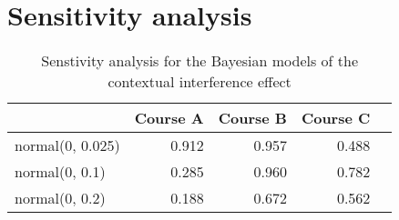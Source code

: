 \section{Sensitivity analysis}

\begin{table}[ht]
\caption{Senstivity analysis for the Bayesian models of the contextual interference effect}\label{paper1: racetimeinteraction}
\centering
\begin{tabular}{lrrrr}
    & Course A & Course B & Course C \\
    \hline
    normal(0, 0.025) & 0.912 & 0.957 & 0.488 \\
    normal(0, 0.1)   & 0.285 & 0.960 & 0.782 \\
    normal(0, 0.2)   & 0.188 & 0.672 & 0.562 \\
\end{tabular}
\end{table}
